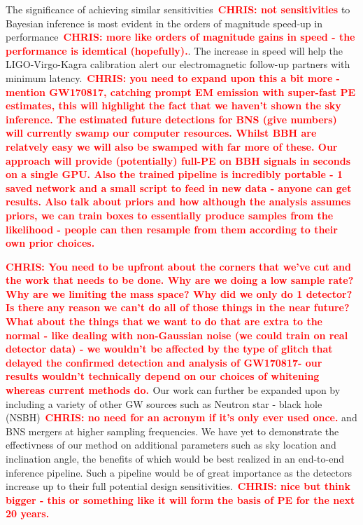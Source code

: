 \documentclass[%
showpacs,
 amsmath,amssymb,
 aps,
 twocolumn,
 prl,
 reprint,
floatfix,
]{revtex4-1}
\newcommand{\chris}[1]{\textbf{\textcolor{red}{CHRIS: #1}}}
\begin{document}
%
%
The significance of achieving similar sensitivities~\chris{not sensitivities}
to Bayesian inference is most evident in the orders of magnitude speed-up in
performance~\chris{more like orders of magnitude gains in speed - the
performance is idemtical (hopefully).}. The increase in speed will help the
LIGO-Virgo-Kagra calibration alert our electromagnetic follow-up partners with
minimum latency.~\chris{you need to expand upon this a bit more - mention
GW170817, catching prompt EM emission with super-fast PE estimates, this will
highlight the fact that we haven't shown the sky inference. The estimated
future detections for BNS (give numbers) will currently swamp our computer
resources. Whilst BBH are relatvely easy we will also be swamped with far more
of these. Our approach will provide (potentially) full-PE on BBH signals in
seconds on a single GPU. Also the trained pipeline is incredibly portable - 1
saved network and a small script to feed in new data - anyone can get results.
Also talk about priors and how although the analysis assumes priors, we can
train boxes to essentially produce samples from the likelihood - people can
then resample from them according to their own prior choices.} 

%
%
\chris{You need to be upfront about the corners that we've cut and the work
that needs to be done. Why are we doing a low sample rate? Why are we limiting
the mass space? Why did we only do 1 detector? Is there any reason we can't do
all of those things in the near future? What about the things that we want to
do that are extra to the normal - like dealing with non-Gaussian noise (we
could train on real detector data) - we wouldn't be affected by the type of
glitch that delayed the confirmed detection and analysis of GW170817- our
results wouldn't technically depend on our choices of whitening whereas current
methods do. } Our work can further be expanded upon by including a variety of
other \ac{GW} sources such as Neutron star - black hole (NSBH)~\chris{no need
for an acronym if it's only ever used once.} and \ac{BNS} mergers at higher
sampling frequencies. We have yet to demonstrate the effectivness of our method
on additional parameters such as sky location and inclination angle, the
benefits of which would be best realized in an end-to-end inference pipeline.
Such a pipeline would be of great importance as the detectors increase up to
their full potential design sensitivities.~\chris{nice but think bigger - this
or something like it will form the basis of PE for the next 20 years.}
\end{document}
